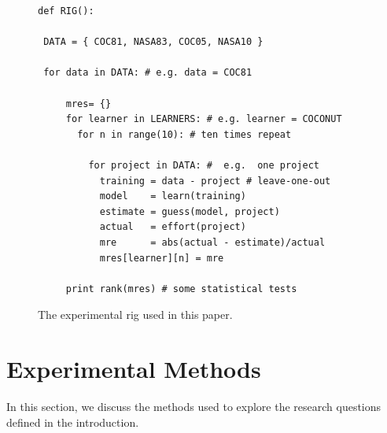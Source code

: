 \documentclass[smallcondesed]{svjour3}
\begin{document}
\begin{figure}
\begin{lstlisting}
def RIG():

 DATA = { COC81, NASA83, COC05, NASA10 }
 
 for data in DATA: # e.g. data = COC81
 
     mres= {}
     for learner in LEARNERS: # e.g. learner = COCONUT 
       for n in range(10): # ten times repeat
       
         for project in DATA: #  e.g.  one project
           training = data - project # leave-one-out
           model    = learn(training)
           estimate = guess(model, project)
           actual   = effort(project)
           mre      = abs(actual - estimate)/actual
           mres[learner][n] = mre
           
     print rank(mres) # some statistical tests
\end{lstlisting}
\caption{The experimental rig used in this paper.}\label{fig:rig}
\end{figure}






\section{Experimental Methods} 

In this section, we discuss the methods used to explore the research questions defined
in the introduction.


\end{document}
